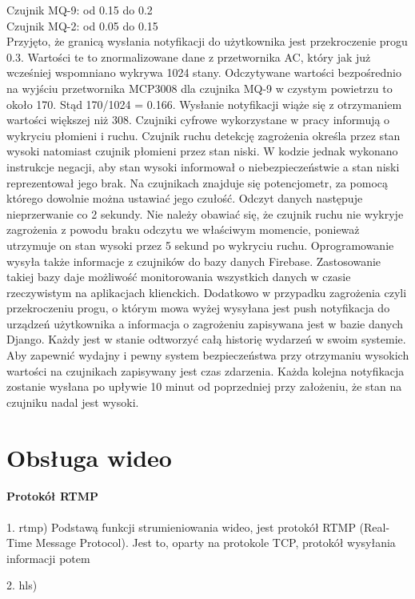 Czujnik MQ-9: od 0.15 do 0.2\\
Czujnik MQ-2: od 0.05 do 0.15\\
Przyjęto, że granicą wysłania notyfikacji do użytkownika jest przekroczenie progu 0.3. Wartości te to znormalizowane dane z przetwornika AC, który jak już wcześniej wspomniano wykrywa 1024 stany. Odczytywane wartości bezpośrednio na wyjściu przetwornika MCP3008 dla czujnika MQ-9 w czystym powietrzu to około 170. Stąd 170/1024 = 0.166. Wysłanie notyfikacji wiąże się z otrzymaniem wartości większej niż 308.
Czujniki cyfrowe wykorzystane w pracy informują o wykryciu płomieni i ruchu. Czujnik ruchu detekcję zagrożenia określa przez stan wysoki natomiast czujnik płomieni przez stan niski. W kodzie jednak wykonano instrukcje negacji, aby stan wysoki informował o niebezpieczeństwie a stan niski reprezentował jego brak. Na czujnikach znajduje się potencjometr, za pomocą którego dowolnie można ustawiać jego czułość. Odczyt danych następuje nieprzerwanie co 2 sekundy. Nie należy obawiać się, że czujnik ruchu nie wykryje zagrożenia z powodu braku odczytu we właściwym momencie, ponieważ utrzymuje on stan wysoki przez 5 sekund po wykryciu ruchu. Oprogramowanie wysyła także informacje z czujników do bazy danych Firebase. Zastosowanie takiej bazy daje możliwość monitorowania wszystkich danych w czasie rzeczywistym na aplikacjach klienckich. Dodatkowo w przypadku zagrożenia czyli przekroczeniu progu, o którym mowa wyżej wysyłana jest push notyfikacja do urządzeń użytkownika a informacja o zagrożeniu zapisywana jest w bazie danych Django. Każdy jest w stanie odtworzyć całą historię wydarzeń w swoim systemie.
Aby zapewnić wydajny i pewny system bezpieczeństwa przy otrzymaniu wysokich wartości na czujnikach zapisywany jest czas zdarzenia. Każda kolejna notyfikacja zostanie wysłana po upływie 10 minut od poprzedniej przy założeniu, że stan na czujniku nadal jest wysoki. 

\section*{Obsługa wideo}

\paragraph{Protokół RTMP}
1. rtmp) Podstawą funkcji strumieniowania wideo, jest protokół RTMP (Real-Time Message Protocol). Jest to, oparty na protokole TCP, protokół wysyłania informacji 
potem

2. hls)

